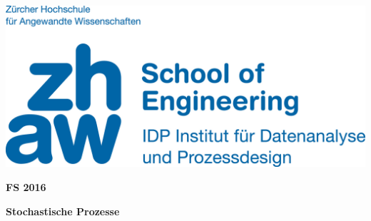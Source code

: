 \noindent
\begin{minipage}[t]{0.4\textwidth} 
\includegraphics[width=\linewidth]{logo.jpg}
\end{minipage}%
\hfill%
\begin{minipage}[t]{0.4\textwidth}\raggedleft
\textbf{\large FS 2016}
\end{minipage}

\begin{center}
 \textbf{\large Stochastische Prozesse} \\
 \vspace{0.3cm}
\end{center}
